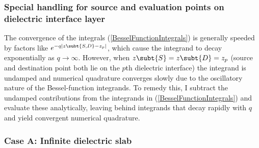 \documentclass[letterpaper]{article}
\begin{document}
\subsubsection{Special handling for source and evaluation points 
               on dielectric interface layer}
\label{PointOnLayerSection}

The convergence of the integrals (\ref{BesselFunctionIntegrals})
is generally speeded by factors like $e^{-q|z\subt{S,D}-z_p|}$,
which cause the integrand to decay exponentially as $q\to\infty$.
However, when $z\subt{S}=z\subt{D}=z_p$ (source and destination
point both lie on the $p$th dielectric interface) the integrand is
undamped and numerical quadrature converges slowly due to
the oscillatory nature of the Bessel-function integrands.
To remedy this, I subtract the undamped contributions
from the integrands in (\ref{BesselFunctionIntegrals}) and
evaluate these analytically, leaving behind integrands that
decay rapidly with $q$ and yield convergent numerical quadrature.

\subsubsection*{Case A: Infinite dielectric slab}
\end{document}
